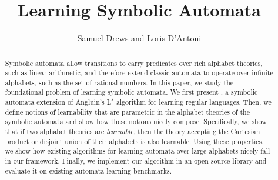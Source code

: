 \documentclass{llncs}
\begin{document}
\title{Learning Symbolic Automata}
\author{Samuel Drews and Loris D'Antoni}

\maketitle
\begin{abstract}
Symbolic  automata allow transitions to carry predicates over
rich alphabet theories, such as linear arithmetic, and therefore extend
classic automata to operate over infinite alphabets, such as
the set of rational numbers. 
In this paper, we study the foundational problem of learning symbolic automata.
We first present \alg,
a symbolic automata extension of Angluin's L$^*$
algorithm for learning regular languages.
Then, we define notions of learnability that are parametric in the alphabet theories
of the symbolic automata and show how these notions nicely compose.
Specifically, we show that if two alphabet theories are \emph{learnable},
then the theory accepting the Cartesian product or disjoint union of their alphabets is also learnable.
Using these properties, we show
how existing algorithms for learning automata over large alphabets nicely fall in our framework.
Finally, we implement our algorithm in an open-source library and evaluate it on existing automata learning benchmarks.
\end{abstract}








\appendix




\end{document}
